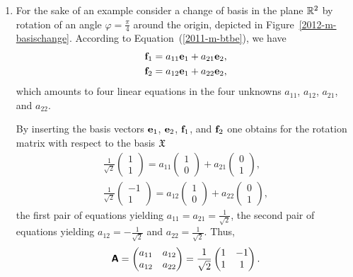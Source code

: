{
\color{blue}
\bexample
\begin{enumerate}

\item
For the sake of an example consider a change of basis in the plane ${\Bbb R}^2$ by rotation of an angle $\varphi = \frac{\pi}{4}$ around the origin,
depicted in Figure~\ref{2012-m-basischange}.
According to Equation~(\ref{2011-m-btbe}),
we have
\begin{equation}
\begin{split}
{\bf f}_1=   a_{11} {\bf e}_1 + a_{21} {\bf e}_2,\\
{\bf f}_2=   a_{12}{\bf e}_1 +  a_{22}{\bf e}_2
,
\end{split}
\end{equation}
which amounts to four linear equations in the four unknowns $a_{11}$, $a_{12}$,
$a_{21}$, and $a_{22}$.


By
inserting the basis vectors
$ {\bf e}_1$, ${\bf e}_2$, ${\bf f}_1$, and ${\bf f}_2$
one obtains for the rotation matrix with respect to the basis ${\frak X}$
\begin{equation}
\begin{split}
\frac{1}{\sqrt{2}}
\begin{pmatrix}
1\\
1
\end{pmatrix}
=
a_{11}
\begin{pmatrix}
1 \\
0
\end{pmatrix}
+
a_{21}
\begin{pmatrix}
0 \\
1
\end{pmatrix} ,
\\
\frac{1}{\sqrt{2}}
\begin{pmatrix}
-1\\
1
\end{pmatrix}
=
a_{12}
\begin{pmatrix}
1 \\
0
\end{pmatrix}
+
a_{22}
\begin{pmatrix}
0 \\
1
\end{pmatrix}
,
\end{split}
\end{equation}
the first pair of equations yielding
$a_{11}=a_{21}=\frac{1}{\sqrt{2}}$,
the second pair of equations yielding
$a_{12}=-\frac{1}{\sqrt{2}}$ and $a_{22}=\frac{1}{\sqrt{2}}$.
Thus,
\begin{equation}
 \textsf{\textbf{A}}=
\begin{pmatrix}
a_{11}&a_{12}\\
a_{12}&a_{22}
\end{pmatrix}
=
\frac{1}{\sqrt{2}}
\begin{pmatrix}
1&-1\\
1&1
\end{pmatrix}
.
\end{equation}


\end{enumerate}}
